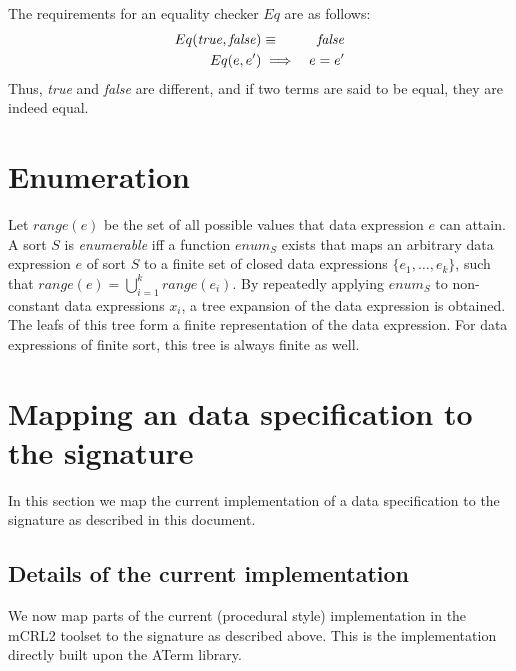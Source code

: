 \documentclass[a4paper,11pt]{article}
\begin{document}
The requirements for an equality checker $Eq$ are as follows:
\begin{eqnarray*}
 Eq({\it true}, {\it false}) & \equiv & {\it false}\\
 Eq(e, e')                   & \implies & e = e'
\end{eqnarray*}
Thus, \textit{true} and \textit{false} are different, and if two terms are said to be equal, they are indeed equal.

\section{Enumeration}
Let $range(e)$ be the set of all possible values that data expression $e$ can attain. A sort $S$ is \emph{enumerable} iff a function $enum_S$ exists that maps an arbitrary data expression $e$ of sort $S$ to a finite set of closed data expressions $\{ e_1, \dots, e_k \}$, such that $range(e) = \bigcup_{i=1}^{k} range(e_i)$. By repeatedly applying $enum_S$ to non-constant data expressions $x_i$, a tree expansion of the data expression is obtained. The leafs of this tree form a finite representation of the data expression. For data expressions of finite sort, this tree is always finite as well.

\section{Mapping an data specification to the signature}
In this section we map the current implementation of a data specification to the signature as described in this document.

\subsection{Details of the current implementation}
We now map parts of the current (procedural style) implementation in the mCRL2 toolset to the signature as described above. This is the implementation directly built upon the ATerm library.
\end{document}
